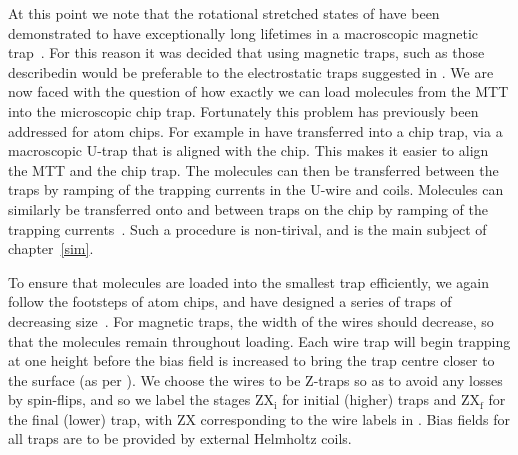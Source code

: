 At this point we note that the rotational stretched states of \CaF{} have been
demonstrated to have exceptionally long lifetimes in a macroscopic magnetic
trap~\cite{WilliamsMagnetic2018}. For this reason it was decided that using
magnetic traps, such as those describedin  would be
preferable to the electrostatic traps suggested in . We
are now faced with the question of how exactly we can load molecules from the
MTT into the microscopic chip trap.
%
Fortunately this problem has previously been addressed for atom chips. For
example in   have transferred  into a chip trap, via a macroscopic U-trap
that is aligned with the chip. This makes it easier to align the MTT and the
chip trap. The molecules can then be transferred between the traps by ramping
of the trapping currents in the U-wire and coils.
%
Molecules can similarly be transferred onto and between traps on the chip by
ramping of the trapping currents~\cite{}. Such a procedure is
non-tirival, and is the main subject of chapter~\ref{sim}.

To ensure that molecules are loaded into the smallest trap efficiently, we
again follow the footsteps of atom chips, and have designed  a series of traps
of decreasing size~\cite{Reichel1999}. For magnetic traps, the width of the
wires should decrease, so that the molecules remain  throughout loading. 
%
Each wire trap will begin trapping at one height before the bias field is
increased to bring the trap centre closer to the surface (as per
). We choose the wires to be Z-traps so as to avoid
any losses by spin-flips, and so we label the stages $\mathrm{ZX_i}$ for
initial (higher) traps and $\mathrm{ZX_f}$ for the final (lower) trap, with
$\mathrm{ZX}$ corresponding to the wire labels in
. Bias fields for all traps are to be provided
by external Helmholtz coils.

